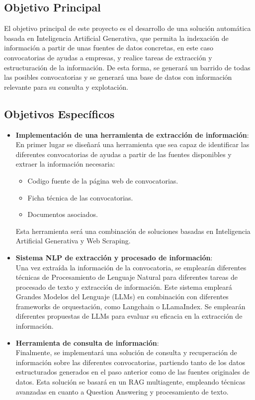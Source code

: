 \subsection{Objetivo Principal}

El objetivo principal de este proyecto es el desarrollo de una solución automática basada en Inteligencia Artificial Generativa, que permita la indexación de información a partir de unas fuentes de datos concretas, en este caso convocatorias de ayudas a empresas, y realice tareas de extracción y estructuración de la información. 
De esta forma, se generará un barrido de todas las posibles convocatorias y se generará una base de datos con información relevante para su consulta y explotación.


\subsection{Objetivos Específicos}

\begin{itemize}

\item \textbf{Implementación de una herramienta de extracción de información}:\\
En primer lugar se diseñará una herramienta que sea capaz de identificar las diferentes convocatorias de ayudas a partir de las fuentes disponibles y extraer la información necesaria:
\begin{itemize}
    \item Codigo fuente de la página web de convocatorias.
    \item Ficha técnica de las convocatorias.
    \item Documentos asociados.
\end{itemize}
Esta herramienta será una combinación de soluciones basadas en Inteligencia Artificial Generativa y Web Scraping.

\item \textbf{Sistema NLP de extracción y procesado de información}:\\ 
Una vez extraída la información de la convocatoria, se emplearán diferentes técnicas de Procesamiento de Lenguaje Natural para diferentes tareas de procesado de texto y extracción de información. 
Este sistema empleará Grandes Modelos del Lenguaje (LLMs) en combinación con diferentes frameworks de orquestación, como Langchain o LLamaIndex.
Se emplearán diferentes propuestas de LLMs para evaluar su eficacia en la extracción de información.

\item \textbf{Herramienta de consulta de información}:\\
Finalmente, se implementará una solución de consulta y recuperación de información sobre las diferentes convocatorias, partiendo tanto de los datos estructurados generados en el paso anterior como de las fuentes originales de datos.
Esta solución se basará en un RAG multiagente, empleando técnicas avanzadas en cuanto a Question Answering y procesamiento de texto.
\end{itemize}

